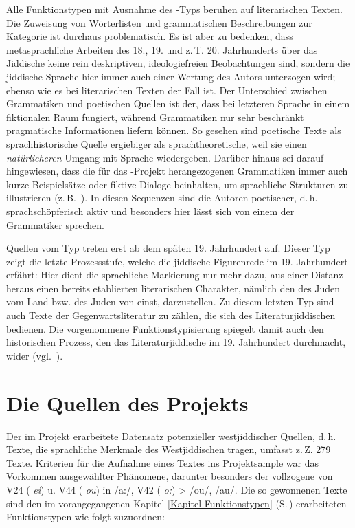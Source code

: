 Alle Funktionstypen mit Ausnahme des -Typs beruhen auf literarischen Texten. Die Zuweisung von Wörterlisten und grammatischen Beschreibungen zur Kategorie  ist durchaus problematisch. Es ist aber zu bedenken, dass  metasprachliche Arbeiten des 18., 19. und z.\,T. 20. Jahrhunderts über das Jiddische keine rein deskriptiven, ideologiefreien Beobachtungen sind, sondern die jiddische Sprache hier immer auch einer Wertung des Autors unterzogen wird; ebenso wie es bei literarischen Texten der Fall ist. Der Unterschied zwischen Grammatiken und poetischen Quellen ist der, dass bei letzteren Sprache in einem fiktionalen Raum fungiert, während Grammatiken nur sehr beschränkt pragmatische Informationen liefern können. So gesehen sind poetische Texte als sprachhistorische Quelle ergiebiger als sprachtheoretische, weil sie einen \textit{natürlicheren} Umgang mit Sprache wiedergeben. Darüber hinaus sei darauf hingewiesen, dass die für das -Projekt herangezogenen Grammatiken immer auch kurze Beispielsätze oder fiktive Dialoge beinhalten, um sprachliche Strukturen zu illustrieren (z.\,B.\, \citealt{Haselbauer1742,Friedrich1784}). In diesen Sequenzen sind die Autoren poetischer, d.\,h. sprachschöpferisch aktiv und besonders hier lässt sich von einem  der Grammatiker sprechen.

	Quellen vom Typ  treten erst ab dem späten 19. Jahrhundert auf. Dieser Typ zeigt die letzte Prozessstufe, welche die jiddische Figurenrede im 19. Jahrhundert erfährt: Hier dient die sprachliche Markierung nur mehr dazu, aus einer Distanz heraus einen bereits etablierten literarischen Charakter, nämlich den des Juden vom Land bzw. des Juden von einst, darzustellen. Zu diesem letzten Typ sind auch Texte der Gegenwartsliteratur zu zählen, die sich des Literaturjiddischen bedienen. Die vorgenommene Funktionstypisierung spiegelt damit auch den historischen Prozess, den das Literaturjiddische im 19. Jahrhundert durchmacht, wider (vgl.\, \citealt[55–59]{SchaeferDiss}).
    
    
    \section{Die Quellen des Projekts }\label{sec:quellenkapitel}
Der im Projekt  erarbeitete Datensatz potenzieller westjiddischer Quellen, d.\,h. Texte, die sprachliche Merkmale des Westjiddischen tragen, umfasst z.\,Z. 279 Texte. Kriterien für die Aufnahme eines Textes ins Projektsample war das Vorkommen ausgewählter Phänomene, darunter besonders der vollzogene   von V24 ({\mhd} \textit{ei}) u. V44 ({\mhd} \textit{ou}) in /a:/, V42 ({\mhd} \textit{o:}) > /ou/, /au/. Die so gewonnenen Texte sind den im vorangegangenen Kapitel \ref{Kapitel Funktionstypen} (S.\,\pageref{Kapitel Funktionstypen}) erarbeiteten Funktionstypen wie folgt zuzuordnen: \\
		 
